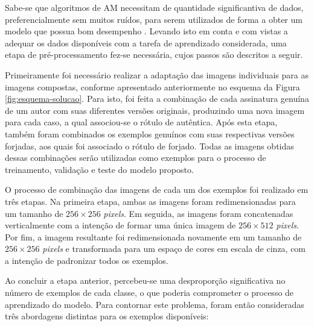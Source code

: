 Sabe-se que algoritmos de AM necessitam de quantidade significantiva de dados, preferencialmente sem muitos ruídos, para serem utilizados de forma a obter um modelo que possua bom desempenho \cite{marsland}. Levando isto em conta e com vistas a adequar os dados disponíveis com a tarefa de aprendizado considerada, uma etapa de pré-processamento fez-se necessária, cujos passos são descritos a seguir.

Primeiramente foi necessário realizar a adaptação das imagens individuais para as imagens compostas, conforme apresentado anteriormente no esquema da Figura \ref{fig:esquema-solucao}. Para isto, foi feita a combinação de cada assinatura genuína de um autor com suas diferentes versões originais, produzindo uma nova imagem para cada caso, a qual associou-se o rótulo de autêntica. Após esta etapa, também foram combinados os exemplos genuínos com suas respectivas versões forjadas, aos quais foi associado o rótulo de forjado. Todas as imagens obtidas dessas combinações serão utilizadas como exemplos para o processo de treinamento, validação e teste do modelo proposto.

O processo de combinação das imagens de cada um dos exemplos foi realizado em três etapas. Na primeira etapa, ambas as imagens foram redimensionadas para um tamanho de $256 \times 256$ \emph{pixels}. Em seguida, as imagens foram concatenadas verticalmente com a intenção de formar uma única imagem de $256 \times 512$ \emph{pixels}. Por fim, a imagem resultante foi redimensionada novamente em um tamanho de $256 \times 256$ \emph{pixels} e transformada para um espaço de cores em escala de cinza, com a intenção de padronizar todos os exemplos.


Ao concluir a etapa anterior, percebeu-se uma desproporção significativa no número de exemplos de cada classe, o que poderia comprometer o processo de aprendizado do modelo. Para contornar este problema, foram então consideradas três abordagens distintas para os exemplos disponíveis:

